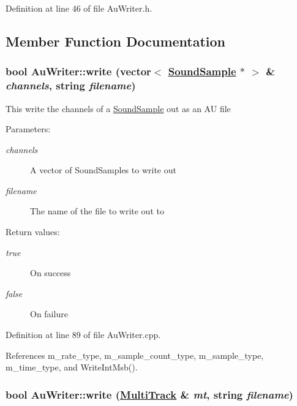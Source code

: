 Definition at line 46 of file Au\-Writer.h.

\subsection{Member Function Documentation}
\hypertarget{classAuWriter_h0}{
\subsubsection[write]{\setlength{\rightskip}{0pt plus 5cm}bool Au\-Writer::write (vector$<$ \hyperlink{classSoundSample}{Sound\-Sample} $\ast$ $>$ \& {\em channels}, string {\em filename})}}
\label{classAuWriter_h0}


This write the channels of a \hyperlink{classSoundSample}{Sound\-Sample} out as an AU file \begin{Desc}
\item[Parameters:]
\begin{description}
\item[{\em channels}]A vector of Sound\-Samples to write out \item[{\em filename}]The name of the file to write out to \end{description}
\end{Desc}
\begin{Desc}
\item[Return values:]
\begin{description}
\item[{\em true}]On success \item[{\em false}]On failure \end{description}
\end{Desc}


Definition at line 89 of file Au\-Writer.cpp.

References m\_\-rate\_\-type, m\_\-sample\_\-count\_\-type, m\_\-sample\_\-type, m\_\-time\_\-type, and Write\-Int\-Msb().\hypertarget{classAuWriter_e2}{
\subsubsection[write]{\setlength{\rightskip}{0pt plus 5cm}bool Au\-Writer::write (\hyperlink{classMultiTrack}{Multi\-Track} \& {\em mt}, string {\em filename})}}
\label{classAuWriter_e2}



